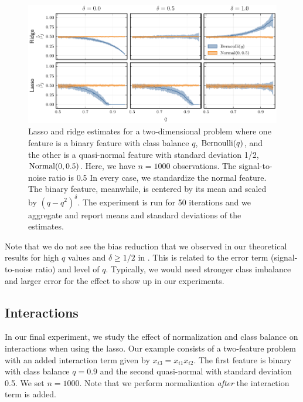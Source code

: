 \begin{figure}[htpb]
  \centering
  \includegraphics{plots/mixed_data.pdf}
  \caption{%
    Lasso and ridge estimates for a two-dimensional problem where one feature is a binary feature with class balance \(q\), \(\operatorname{Bernoulli}(q)\), and the other is a quasi-normal feature with standard deviation 1/2, \(\operatorname{Normal}(0, 0.5)\). Here, we have \(n = \num{1000}\) observations. The signal-to-noise ratio is 0.5 In every case, we standardize the normal feature. The binary feature, meanwhile, is centered by its mean and scaled by \((q-q^2)^\delta\). The experiment is run for 50 iterations and we aggregate and report means and standard deviations of the estimates.}
  \label{fig:lasso-ridge-comparison}
\end{figure}

Note that we do not see the bias reduction that we observed in our theoretical results for high \(q\) values and \(\delta \geq 1/2\) in . This is related to the error term (signal-to-noise ratio) and level of \(q\). Typically, we would need stronger class imbalance and larger error for the effect to show up in our experiments.

\subsection{Interactions}\label{sec:experiments-interactions}

In our final experiment, we study the effect of normalization and class balance on interactions when using the lasso. Our example consists of a two-feature problem with an added interaction term given by \(x_{i3} = x_{i1}x_{i2}\). The first feature is binary with class balance \(q=0.9\) and the second quasi-normal with standard deviation 0.5. We set \(n=1000\). Note that we perform normalization \emph{after} the interaction term is added.

